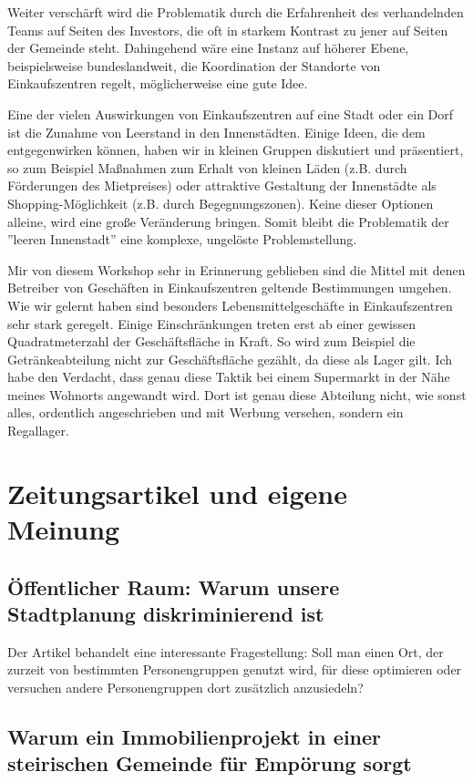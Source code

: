 \documentclass[]{article}
\begin{document}
Weiter verschärft wird die Problematik durch die Erfahrenheit des verhandelnden Teams auf Seiten des Investors, die oft in starkem Kontrast zu jener auf Seiten der Gemeinde steht. Dahingehend wäre eine Instanz auf höherer Ebene, beispielsweise bundeslandweit, die Koordination der Standorte von Einkaufszentren regelt, möglicherweise eine gute Idee.

Eine der vielen Auswirkungen von Einkaufszentren auf eine Stadt oder ein Dorf ist die Zunahme von Leerstand in den Innenstädten. Einige Ideen, die dem entgegenwirken können, haben wir in kleinen Gruppen diskutiert und präsentiert, so zum Beispiel Maßnahmen zum Erhalt von kleinen Läden (z.B. durch Förderungen des Mietpreises) oder attraktive Gestaltung der Innenstädte als Shopping-Möglichkeit (z.B. durch Begegnungszonen). Keine dieser Optionen alleine, wird eine große Veränderung bringen. Somit bleibt die Problematik der ''leeren Innenstadt'' eine komplexe, ungelöste Problemstellung.

Mir von diesem Workshop sehr in Erinnerung geblieben sind die Mittel mit denen Betreiber von Geschäften in Einkaufszentren geltende Bestimmungen umgehen. Wie wir gelernt haben sind besonders Lebensmittelgeschäfte in Einkaufszentren sehr stark geregelt. Einige Einschränkungen treten erst ab einer gewissen Quadratmeterzahl der Geschäftsfläche in Kraft. So wird zum Beispiel die Getränkeabteilung nicht zur Geschäftsfläche gezählt, da diese als Lager gilt. Ich habe den Verdacht, dass genau diese Taktik bei einem Supermarkt in der Nähe meines Wohnorts angewandt wird. Dort ist genau diese Abteilung nicht, wie sonst alles, ordentlich angeschrieben und mit Werbung versehen, sondern ein Regallager.

\section{Zeitungsartikel und eigene Meinung}
\subsection{Öffentlicher Raum: Warum unsere Stadtplanung diskriminierend ist}
Der Artikel behandelt eine interessante Fragestellung: Soll man einen Ort, der zurzeit von bestimmten Personengruppen genutzt wird, für diese optimieren oder versuchen andere Personengruppen dort zusätzlich anzusiedeln?



\subsection{Warum ein Immobilienprojekt in einer steirischen Gemeinde für Empörung sorgt}
\end{document}
